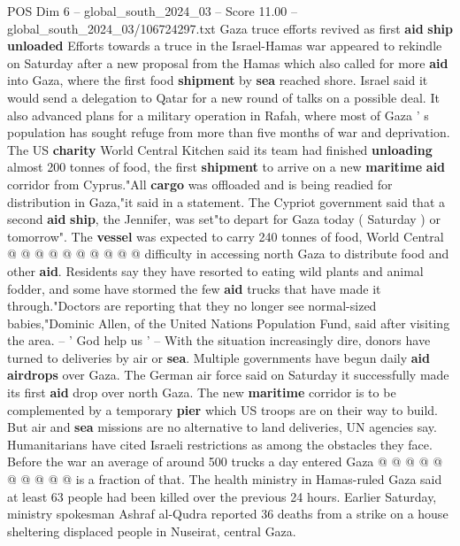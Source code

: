 \begin{textsample}{POS Dim 6 – global\_south\_2024\_03 – Score 11.00 – global\_south\_2024\_03/106724297.txt}  \label{ex:f6_pos_038}
Gaza truce efforts revived as first \textbf{aid} \textbf{ship} \textbf{unloaded} Efforts towards a truce in the Israel-Hamas war appeared to rekindle on Saturday after a new proposal from the Hamas which also called for more \textbf{aid} into Gaza, where the first food \textbf{shipment} by \textbf{sea} reached shore.
Israel said it would send a delegation to Qatar for a new round of talks on a possible deal.
It also advanced plans for a military operation in Rafah, where most of Gaza ' s population has sought refuge from more than five months of war and deprivation.
The US \textbf{charity} World Central Kitchen said its team had finished \textbf{unloading} almost 200 tonnes of food, the first \textbf{shipment} to arrive on a new \textbf{maritime} \textbf{aid} corridor from Cyprus."All \textbf{cargo} was offloaded and is being readied for distribution in Gaza,"it said in a statement.
The Cypriot government said that a second \textbf{aid} \textbf{ship}, the Jennifer, was set"to depart for Gaza today ( Saturday ) or tomorrow".
The \textbf{vessel} was expected to carry 240 tonnes of food, World Central @ @ @ @ @ @ @ @ @ @ difficulty in accessing north Gaza to distribute food and other \textbf{aid}.
Residents say they have resorted to eating wild plants and animal fodder, and some have stormed the few \textbf{aid} trucks that have made it through."Doctors are reporting that they no longer see normal-sized babies,"Dominic Allen, of the United Nations Population Fund, said after visiting the area. -- ' God help us ' -- With the situation increasingly dire, donors have turned to deliveries by air or \textbf{sea}.
Multiple governments have begun daily \textbf{aid} \textbf{airdrops} over Gaza.
The German air force said on Saturday it successfully made its first \textbf{aid} drop over north Gaza.
The new \textbf{maritime} corridor is to be complemented by a temporary \textbf{pier} which US troops are on their way to build.
But air and \textbf{sea} missions are no alternative to land deliveries, UN agencies say.
Humanitarians have cited Israeli restrictions as among the obstacles they face.
Before the war an average of around 500 trucks a day entered Gaza @ @ @ @ @ @ @ @ @ @ is a fraction of that.
The health ministry in Hamas-ruled Gaza said at least 63 people had been killed over the previous 24 hours.
Earlier Saturday, ministry spokesman Ashraf al-Qudra reported 36 deaths from a strike on a house sheltering displaced people in Nuseirat, central Gaza.

\end{textsample}
